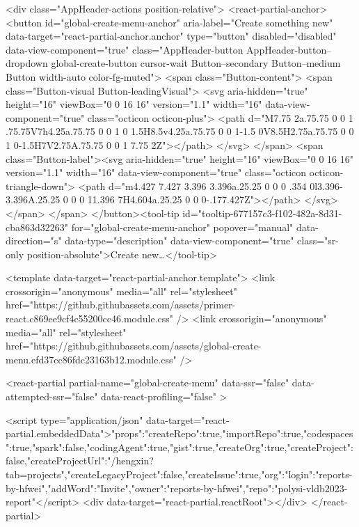         <div class="AppHeader-actions position-relative">
             <react-partial-anchor>
      <button id="global-create-menu-anchor" aria-label="Create something new" data-target="react-partial-anchor.anchor" type="button" disabled="disabled" data-view-component="true" class="AppHeader-button AppHeader-button--dropdown global-create-button cursor-wait Button--secondary Button--medium Button width-auto color-fg-muted">  <span class="Button-content">
      <span class="Button-visual Button-leadingVisual">
        <svg aria-hidden="true" height="16" viewBox="0 0 16 16" version="1.1" width="16" data-view-component="true" class="octicon octicon-plus">
    <path d="M7.75 2a.75.75 0 0 1 .75.75V7h4.25a.75.75 0 0 1 0 1.5H8.5v4.25a.75.75 0 0 1-1.5 0V8.5H2.75a.75.75 0 0 1 0-1.5H7V2.75A.75.75 0 0 1 7.75 2Z"></path>
</svg>
      </span>
    <span class="Button-label"><svg aria-hidden="true" height="16" viewBox="0 0 16 16" version="1.1" width="16" data-view-component="true" class="octicon octicon-triangle-down">
    <path d="m4.427 7.427 3.396 3.396a.25.25 0 0 0 .354 0l3.396-3.396A.25.25 0 0 0 11.396 7H4.604a.25.25 0 0 0-.177.427Z"></path>
</svg></span>
  </span>
</button><tool-tip id="tooltip-677157c3-f102-482a-8d31-cba863d32263" for="global-create-menu-anchor" popover="manual" data-direction="s" data-type="description" data-view-component="true" class="sr-only position-absolute">Create new…</tool-tip>

      <template data-target="react-partial-anchor.template">
        <link crossorigin="anonymous" media="all" rel="stylesheet" href="https://github.githubassets.com/assets/primer-react.c869ee9cf4c55200cc46.module.css" />
<link crossorigin="anonymous" media="all" rel="stylesheet" href="https://github.githubassets.com/assets/global-create-menu.efd37cc86fdc23163b12.module.css" />

<react-partial
  partial-name="global-create-menu"
  data-ssr="false"
  data-attempted-ssr="false"
  data-react-profiling="false"
>
  
  <script type="application/json" data-target="react-partial.embeddedData">{"props":{"createRepo":true,"importRepo":true,"codespaces":true,"spark":false,"codingAgent":true,"gist":true,"createOrg":true,"createProject":false,"createProjectUrl":"/hengxin?tab=projects","createLegacyProject":false,"createIssue":true,"org":{"login":"reports-by-hfwei","addWord":"Invite"},"owner":"reports-by-hfwei","repo":"polysi-vldb2023-report"}}</script>
  <div data-target="react-partial.reactRoot"></div>
</react-partial>


